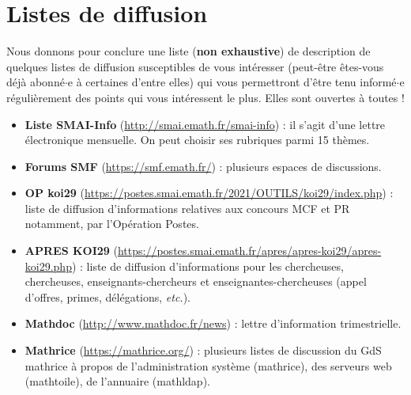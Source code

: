 
\chapter{Listes de diffusion}


Nous donnons  pour conclure une liste (\textbf{non exhaustive}) de description de quelques listes de diffusion susceptibles de vous int\'eresser (peut-\^etre \^etes-vous
d\'ej\`a abonn\'e$\cdot$e \`a certaines d'entre elles) qui vous permettront d'\^etre
tenu inform\'e$\cdot$e r\'eguli\`erement des points qui vous int\'eressent le plus. Elles sont ouvertes \`a tou\mp te\mp s !

\vspace{\baselineskip}
\begin{itemize}[itemsep = 15pt]

\item {\bf Liste SMAI-Info} (\url{http://smai.emath.fr/smai-info}) : il s'agit d'une lettre \'electronique
mensuelle. On peut choisir ses rubriques parmi 15 th\`emes.
\item {\bf Forums SMF} (\url{https://smf.emath.fr/}) : plusieurs espaces de discussions. 

\item {\bf OP koi29} (\url{https://postes.smai.emath.fr/2021/OUTILS/koi29/index.php}) : liste de diffusion d'informations relatives
aux concours MCF et PR notamment, par l'Op\'eration Postes. 

\item{\bf APRES KOI29} (\url{https://postes.smai.emath.fr/apres/apres-koi29/apres-koi29.php}) :
liste de diffusion d'informations pour les chercheuses, chercheuses,
enseignants-chercheurs et enseignantes-chercheuses (appel d'offres, primes, d\'el\'egations,
{\em etc.}). 

\item {\bf Mathdoc} (\url{http://www.mathdoc.fr/news}) : lettre d'information trimestrielle.

\item {\bf Mathrice} (\url{https://mathrice.org/}) : plusieurs listes de discussion du GdS
mathrice \`a propos de l'administration syst\`eme (mathrice), des serveurs web
 (mathtoile), de l'annuaire (mathldap).



\end{itemize}
